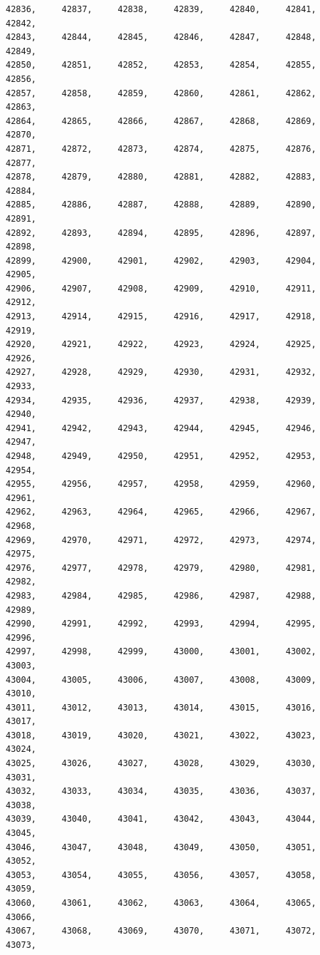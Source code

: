 \documentclass[a4paper,11pt]{report}
\begin{document}
\begin{verbatim}
42836,     42837,     42838,     42839,     42840,     42841,     42842,     
42843,     42844,     42845,     42846,     42847,     42848,     42849,     
42850,     42851,     42852,     42853,     42854,     42855,     42856,     
42857,     42858,     42859,     42860,     42861,     42862,     42863,     
42864,     42865,     42866,     42867,     42868,     42869,     42870,     
42871,     42872,     42873,     42874,     42875,     42876,     42877,     
42878,     42879,     42880,     42881,     42882,     42883,     42884,     
42885,     42886,     42887,     42888,     42889,     42890,     42891,     
42892,     42893,     42894,     42895,     42896,     42897,     42898,     
42899,     42900,     42901,     42902,     42903,     42904,     42905,     
42906,     42907,     42908,     42909,     42910,     42911,     42912,     
42913,     42914,     42915,     42916,     42917,     42918,     42919,     
42920,     42921,     42922,     42923,     42924,     42925,     42926,     
42927,     42928,     42929,     42930,     42931,     42932,     42933,     
42934,     42935,     42936,     42937,     42938,     42939,     42940,     
42941,     42942,     42943,     42944,     42945,     42946,     42947,     
42948,     42949,     42950,     42951,     42952,     42953,     42954,     
42955,     42956,     42957,     42958,     42959,     42960,     42961,     
42962,     42963,     42964,     42965,     42966,     42967,     42968,     
42969,     42970,     42971,     42972,     42973,     42974,     42975,     
42976,     42977,     42978,     42979,     42980,     42981,     42982,     
42983,     42984,     42985,     42986,     42987,     42988,     42989,     
42990,     42991,     42992,     42993,     42994,     42995,     42996,     
42997,     42998,     42999,     43000,     43001,     43002,     43003,     
43004,     43005,     43006,     43007,     43008,     43009,     43010,     
43011,     43012,     43013,     43014,     43015,     43016,     43017,     
43018,     43019,     43020,     43021,     43022,     43023,     43024,     
43025,     43026,     43027,     43028,     43029,     43030,     43031,     
43032,     43033,     43034,     43035,     43036,     43037,     43038,     
43039,     43040,     43041,     43042,     43043,     43044,     43045,     
43046,     43047,     43048,     43049,     43050,     43051,     43052,     
43053,     43054,     43055,     43056,     43057,     43058,     43059,     
43060,     43061,     43062,     43063,     43064,     43065,     43066,     
43067,     43068,     43069,     43070,     43071,     43072,     43073,     

\end{verbatim}
\end{document}
